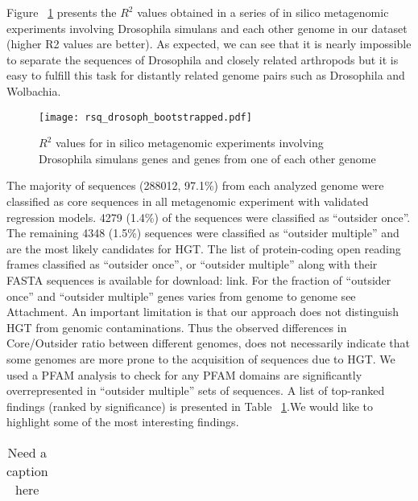 Figure ~\ref{fig:rsquared_curve} presents the $R^2$ values obtained in a series of in silico metagenomic
experiments involving Drosophila simulans and each other genome in our dataset
(higher R2 values are better). As expected, we can see that it is nearly
impossible to separate the sequences of Drosophila and closely related
arthropods but it is easy to fulfill this task for distantly related genome
pairs such as Drosophila and Wolbachia.
\begin{center}
\begin{figure}
\texttt{[image: rsq\_drosoph\_bootstrapped.pdf]}
\caption{$R^2$ values for in silico metagenomic experiments involving Drosophila simulans genes and genes from one of each other genome}
\label{fig:rsquared_curve}
\end{figure}
\end{center}
The majority of sequences
(288012, 97.1\%) from each analyzed genome were classified as core sequences in
all metagenomic experiment with validated regression models. 4279 (1.4\%) of
the sequences were classified as “outsider once”. The remaining 4348 (1.5\%)
sequences were classified as “outsider multiple” and are the most likely
candidates for HGT. The list of protein-coding open reading frames classified
as “outsider once”, or “outsider multiple” along with their FASTA sequences is
available for download: link. For the fraction of “outsider once” and “outsider
multiple” genes varies from genome to genome see Attachment.
An important limitation is that our approach does not distinguish HGT from genomic
contaminations. Thus the observed differences in Core/Outsider ratio between
different genomes, does not necessarily indicate that some genomes are more
prone to the acquisition of sequences due to HGT. We used a PFAM analysis to
check for any PFAM domains are significantly overrepresented in “outsider
multiple” sets of sequences. A list of top-ranked findings (ranked by
significance) is presented in Table ~\ref{table:pfam_domains}.We would like to highlight some of the
most interesting findings.
\begin{center}
\begin{table}[]
\centering
\caption{Need a caption here}
\label{table:pfam_domains}
\begin{tabular}{ll}
\end{tabular}
\end{table}
\end{center}
